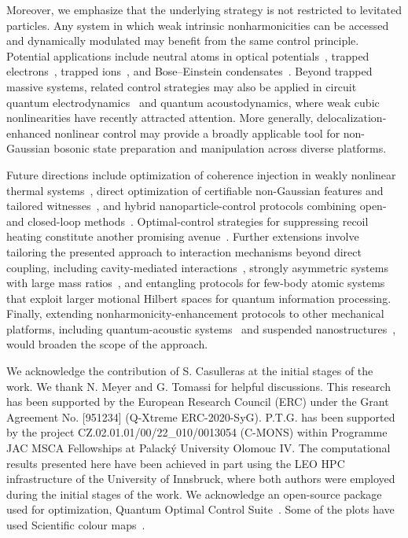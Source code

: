 \documentclass[reprint,prx,footinbib,floatfix,twocolumn,longbibliography,superscriptaddress]{revtex4-2}
\begin{document}
Moreover, we emphasize that the underlying strategy is not restricted to levitated particles.
Any system in which weak intrinsic nonharmonicities can be accessed and dynamically modulated may benefit from the same control principle.
Potential applications include neutral atoms in optical potentials~\cite{Murmann2015a,Kaufman2015a,Dupont2021,Kendell2024}, trapped electrons~\cite{Osada2022}, trapped ions~\cite{Matsos2024,Matsos2025}, and Bose–Einstein condensates~\cite{Bucker2011,Bucker2013,vanFrank2016a,Ji2026}.
Beyond trapped massive systems, related control strategies may also be applied in circuit quantum electrodynamics~\cite{Eriksson2024} and quantum acoustodynamics, where weak cubic nonlinearities have recently attracted attention.
More generally, delocalization-enhanced nonlinear control may provide a broadly applicable tool for non-Gaussian bosonic state preparation and manipulation across diverse platforms.


Future directions include optimization of coherence injection in weakly nonlinear thermal systems~\cite{Yang2025}, direct optimization of certifiable non-Gaussian features and tailored witnesses~\cite{Moore2019,Zaw2023}, and hybrid nanoparticle-control protocols combining open- and closed-loop methods~\cite{Poddubny2024,Winkler2025}.
Optimal-control strategies for suppressing recoil heating constitute another promising avenue~\cite{Zhang2024}.
Further extensions involve tailoring the presented approach to interaction mechanisms beyond direct coupling, including cavity-mediated interactions~\cite{Vijayan2024}, strongly asymmetric systems with large mass ratios~\cite{Bykov2025}, and entangling protocols for few-body atomic systems that exploit larger motional Hilbert spaces for quantum information processing.
Finally, extending nonharmonicity-enhancement protocols to other mechanical platforms, including quantum-acoustic systems~\cite{Marti2024,Rahman2025} and suspended nanostructures~\cite{Chan2011}, would broaden the scope of the approach.

\begin{acknowledgments}
We acknowledge the contribution of S. Casulleras at the initial stages of the work.
We thank N. Meyer and G. Tomassi for helpful discussions.
This research has been supported by the European Research Council (ERC) under the Grant Agreement No. [951234] (Q-Xtreme ERC-2020-SyG).
P.T.G. has been supported by the project CZ.02.01.01/00/22\_010/0013054 (C-MONS) within Programme JAC MSCA Fellowships at Palacký University Olomouc IV.
The computational results presented here have been achieved in part using the LEO HPC infrastructure of the University of Innsbruck, where both authors were employed during the initial stages of the work.
We acknowledge an open-source package used for optimization, Quantum Optimal Control Suite~\cite{Rossignolo2023}.
Some of the plots have used Scientific colour maps~\cite{Crameri2020,Crameri2023}.
\end{acknowledgments}
\end{document}
